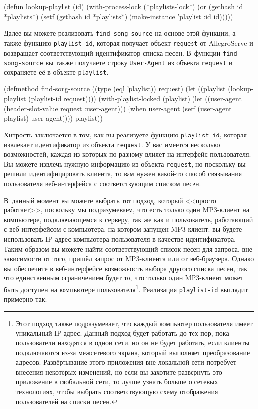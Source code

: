 \begin{myverb}
(defun lookup-playlist (id)
  (with-process-lock (*playlists-lock*)
    (or (gethash id *playlists*)
        (setf (gethash id *playlists*) (make-instance 'playlist :id id)))))
\end{myverb}

Далее вы можете реализовать \lstinline{find-song-source} на основе этой функции, а также
функцию \lstinline{playlist-id}, которая получает объект \lstinline{request} от AllegroServe и
возвращает соответствующий идентификатор списка песен.  В~функции \lstinline{find-song-source}
вы также получаете строку \lstinline{User-Agent} из объекта \lstinline{request} и сохраняете её в
объекте \lstinline{playlist}.

\begin{myverb}
(defmethod find-song-source ((type (eql 'playlist)) request)
  (let ((playlist (lookup-playlist (playlist-id request))))
    (with-playlist-locked (playlist)
      (let ((user-agent (header-slot-value request :user-agent)))
        (when user-agent (setf (user-agent playlist) user-agent))))
    playlist))
\end{myverb}

Хитрость заключается в том, как вы реализуете функцию \lstinline{playlist-id}, которая
извлекает идентификатор из объекта \lstinline{request}.  У вас имеется несколько возможностей,
каждая из которых по-разному влияет на интерфейс пользователя.  Вы можете извлечь нужную
информацию из объекта \lstinline{request}, но поскольку вы решили идентифицировать клиента, то
вам нужен какой-то способ связывания пользователя веб-интерфейса с соответствующим списком
песен.

В~данный момент вы можете выбрать тот подход, который <<просто работает>>, поскольку мы
подразумеваем, что есть только один MP3-клиент на компьютере, подключающемся к серверу,
так же как и пользователь, работающий с веб-интерфейсом с компьютера, на котором запущен
MP3-клиент: вы будете использовать IP-адрес компью\-те\-ра пользователя в качестве
идентификатора.  Таким образом вы можете найти соответствующий список песен для запроса,
вне зависимости от того, пришёл запрос от MP3-клиента или от веб-браузера.  Однако вы
обеспечите в веб-интерфейсе возможность выбора другого списка песен, так что единственным
ограничением будет то, что только один MP3-клиент может быть доступен на компьютере
пользователя\footnote{Этот подход также подразумевает, что каждый компьютер пользователя
  имеет уникальный IP-адрес.  Данный подход будет работать до тех пор, пока пользователи
  находятся в одной сети, но он не будет работать, если клиенты подключаются из-за
  межсетевого экрана, который выполняет преобразование адресов.  Развёртывание этого
  приложения вне локальной сети потребует внесения некоторых изменений, но если вы
  захотите развернуть это приложение в глобальной сети, то лучше узнать больше о сетевых
  технологиях, чтобы выбрать соответствующую схему отображения пользователей на списки
  песен.}.  Реализация \lstinline{playlist-id} выглядит примерно так:


